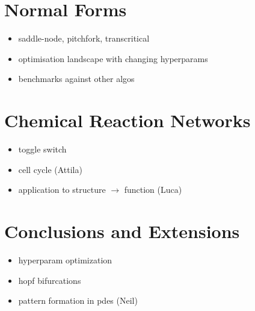\documentclass{article}[12pt]
\numberwithin{equation}{section}
\begin{document}
\section{Normal Forms}
\label{sec:normal-forms}

\begin{itemize}
    \item saddle-node, pitchfork, transcritical
    \item optimisation landscape with changing hyperparams
    \item benchmarks against other algos
\end{itemize}


\section{Chemical Reaction Networks}
\label{sec:networks}

\begin{itemize}
    \item toggle switch
    \item cell cycle (Attila)
    \item application to structure $\rightarrow$ function (Luca)
\end{itemize}

\section{Conclusions and Extensions}
\label{sec:conclusions}

\begin{itemize}
    \item hyperparam optimization
    \item hopf bifurcations
    \item pattern formation in pdes (Neil)
\end{itemize}



\end{document}

